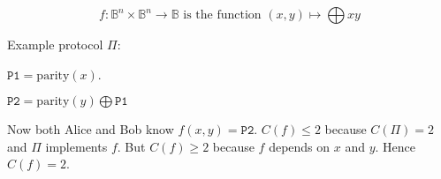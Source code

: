 \begin{example}
\[f : \mathbb{B}^n \times \mathbb{B}^n \to \mathbb{B} \text{ is the function }
   (x, y) \mapsto \bigoplus xy\]
\end{example}
\pause
Example protocol $\Pi$:
\begin{leftbubbles}
{\footnotesize $\texttt{P1}=\text{parity}(x)$.}
\end{leftbubbles}
\pause
\begin{rightbubbles}
{\footnotesize $\texttt{P2}=\text{parity}(y) \bigoplus \texttt{P1}$}
\end{rightbubbles}
\pause
Now both Alice and Bob know $f(x, y) = \texttt{P2}$.
$C(f) \leq 2$ because $C(\Pi) = 2$ and $\Pi$ implements $f$.
But $C(f) \geq 2$ because $f$ depends on $x$ and $y$.
Hence \(C(f) = 2\).